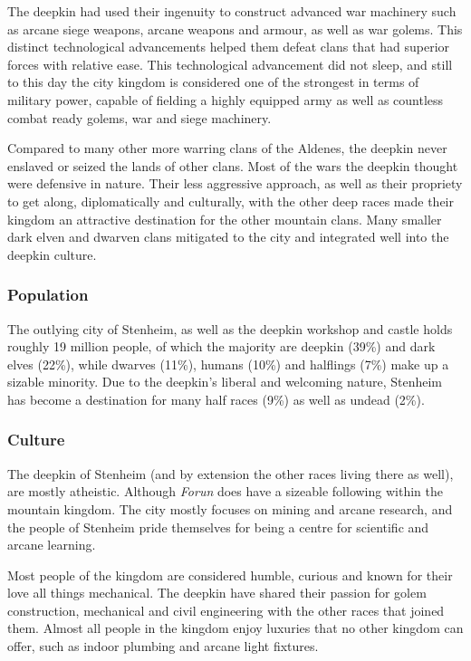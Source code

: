 The deepkin had used their ingenuity to construct advanced war machinery such
as arcane siege weapons, arcane weapons and armour, as well as war
golems. This distinct technological advancements helped them defeat clans that
had superior forces with relative ease. This technological advancement did not
sleep, and still to this day the city kingdom is considered one of the
strongest in terms of military power, capable of fielding a highly equipped
army as well as countless combat ready golems, war and siege machinery.

Compared to many other more warring clans of the Aldenes, the deepkin never
enslaved or seized the lands of other clans. Most of the wars the deepkin
thought were defensive in nature. Their less aggressive approach, as well as
their propriety to get along, diplomatically and culturally, with the other
deep races made their kingdom an attractive destination for the other mountain
clans. Many smaller dark elven and dwarven clans mitigated to the city and
integrated well into the deepkin culture.

\subsubsection*{Population}

The outlying city of Stenheim, as well as the deepkin workshop and castle holds
roughly 19 million people, of which the majority are deepkin (39\%) and dark
elves (22\%), while dwarves (11\%), humans (10\%) and halflings (7\%) make up a
sizable minority. Due to the deepkin's liberal and welcoming nature, Stenheim
has become a destination for many half races (9\%) as well as undead (2\%).

\subsubsection*{Culture}

The deepkin of Stenheim (and by extension the other races living there as
well), are mostly atheistic. Although \emph{Forun} does have a sizeable
following within the mountain kingdom. The city mostly focuses on mining and
arcane research, and the people of Stenheim pride themselves for being a
centre for scientific and arcane learning.

Most people of the kingdom are considered humble, curious and known for their
love all things mechanical. The deepkin have shared their passion for golem
construction, mechanical and civil engineering with the other races that joined
them. Almost all people in the kingdom enjoy luxuries that no other kingdom can
offer, such as indoor plumbing and arcane light fixtures.

